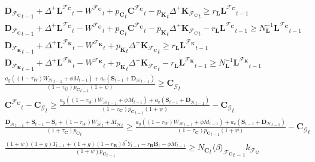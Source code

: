 \documentclass[a4paper, headings=standardclasses]{scrartcl}
\numberwithin{equation}{subsection}
\begin{document}
{\allowdisplaybreaks \tiny
	\begin{gather}
		{\mathbf{D}_{\mathcal{F}_\mathbf{C}}}_{t-1} + {\Delta^+{\mathbf{L}^{\mathcal{F}_\mathbf{C}}}}_t - {W^{\mathcal{F}_\mathbf{C}}}_t + {p_{\mathbf{C}}}_t {\mathbf{C}^{\mathcal{F}_\mathbf{C}}}_t - {p_{\mathbf{K}}}_t {\Delta^+{\mathbf{K}_{\mathcal{F}_\mathbf{C}}}}_t \ge r_\mathbf{L} {\mathbf{L}^{\mathcal{F}_\mathbf{C}}}_{t-1} \\
		{\mathbf{D}_{\mathcal{F}_\mathbf{C}}}_{t-1} + {\Delta^+{\mathbf{L}^{\mathcal{F}_\mathbf{C}}}}_t - {W^{\mathcal{F}_\mathbf{C}}}_t + {p_{\mathbf{C}}}_t {\mathbf{C}^{\mathcal{F}_\mathbf{C}}}_t - {p_{\mathbf{K}}}_t {\Delta^+{\mathbf{K}_{\mathcal{F}_\mathbf{C}}}}_t - r_\mathbf{L} {\mathbf{L}^{\mathcal{F}_\mathbf{C}}}_{t-1} \ge N_\mathbf{L}^{-1} {\mathbf{L}^{\mathcal{F}_\mathbf{C}}}_{t-1} \\
		{\mathbf{D}_{\mathcal{F}_\mathbf{K}}}_{t-1} + {\Delta^+{\mathbf{L}^{\mathcal{F}_\mathbf{K}}}}_t - {W^{\mathcal{F}_\mathbf{K}}}_t +  {p_{\mathbf{K}}}_t {\Delta^+{\mathbf{K}_{\mathcal{F}_\mathbf{C}}}}_t \ge r_\mathbf{L} {\mathbf{L}^{\mathcal{F}_\mathbf{K}}}_{t-1} \\
		{\mathbf{D}_{\mathcal{F}_\mathbf{K}}}_{t-1} + {\Delta^+{\mathbf{L}^{\mathcal{F}_\mathbf{K}}}}_t - {W^{\mathcal{F}_\mathbf{K}}}_t +  {p_{\mathbf{K}}}_t {\Delta^+{\mathbf{K}_{\mathcal{F}_\mathbf{C}}}}_t - {r_\mathbf{L}} {\mathbf{L}^{\mathcal{F}_\mathbf{K}}}_{t-1} \ge N_\mathbf{L}^{-1} {\mathbf{L}^{\mathcal{F}_\mathbf{K}}}_{t-1} \\
		\frac{a_y ((1-\tau_W) {W_\mathcal{H}}_{t-1} + \phi M_{t-1}) + a_v (\mathbf{S}_{t-1} + {\mathbf{D}_\mathcal{H}}_{t-1})}{{(1-\tau_\mathbf{C}) p_\mathbf{C}}_{t-1} (1+\psi)} \ge {\mathbf{C}_\mathcal{G}}_t \\
		{\mathbf{C}^{\mathcal{F}_\mathbf{C}}}_t - {\mathbf{C}_\mathcal{G}}_t \ge \frac{a_y ((1-\tau_W) {W_\mathcal{H}}_{t-1} + \phi M_{t-1}) + a_v (\mathbf{S}_{t-1} + {\mathbf{D}_\mathcal{H}}_{t-1})}{{(1-\tau_\mathbf{C}) p_\mathbf{C}}_{t-1} (1+\psi)} - {\mathbf{C}_\mathcal{G}}_t\\
		\frac{{\mathbf{D}_\mathcal{H}}_{t-1} + \mathbf{S}_{t-1} - \mathbf{S}_t + (1 - \tau_W){W_\mathcal{H}} _t + {M_\mathcal{H}} _t}{(1+\tau_{\mathbf{C}}){p_\mathbf{C}}_t} \ge \frac{a_y ((1-\tau_W) {W_\mathcal{H}}_{t-1} + \phi M_{t-1}) + a_v (\mathbf{S}_{t-1} + {\mathbf{D}_\mathcal{H}}_{t-1})}{{(1-\tau_\mathbf{C}) p_\mathbf{C}}_{t-1} (1+\psi)} - {\mathbf{C}_\mathcal{G}}_t\\
		\frac{(1+\psi)(1+g){T}_{t-1} + (1+g)(1-r_\mathbf{B})\delta^* Y_{t-1} - r_\mathbf{B} \mathbf{B}_t - \phi M_{t-1}}{(1+\psi) {p_\mathbf{C}}_{t-1}} \ge {N_\mathbf{C}}_t {\langle \beta \rangle_{\mathcal{F}_\mathbf{C}}}_{t-1} k_{\mathcal{F}_\mathbf{C}} \\

\end{gather}}
\end{document}
